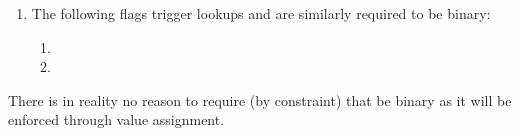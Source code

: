 \begin{enumerate}
\begin{enumerate}
			\item \txnDataHubRequiresEvmExecution   {}
			\item \txnDataHubCopyTxcd               {}
			\item \txnDataHubStatusCode             {}
			\item \txnDataHubEipBeaconRoot          {}
			\item \txnDataHubEipBlockHash           {}
		\end{enumerate}
	\item
		The following flags trigger lookups and are similarly required to be binary:
		\begin{enumerate}
			\item \txnDataCmptnEucFlag{}
			\item \txnDataCmptnWcpFlag{}
		\end{enumerate}
\end{enumerate}
\saNote{}
There is in reality no reason to require (by constraint) that \txnDataHubCopyTxcd{} be binary as it will be enforced through value assignment.
